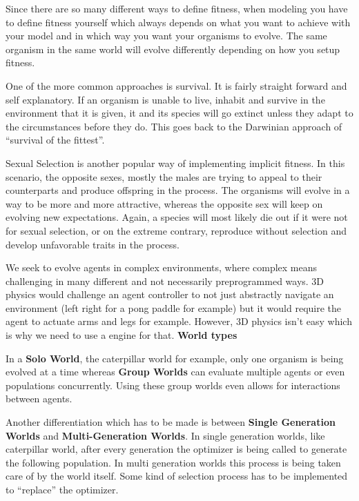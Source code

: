 \documentclass[12pt,oneside,listof=totoc,paper=a4,headings=small]{scrbook}
\begin{document}
Since there are so many different ways to define fitness, when modeling you have to define fitness yourself which always depends on what you want to achieve with your model and in which way you want your organisms to evolve. The same organism in the same world will evolve differently depending on how you setup fitness.

One of the more common approaches is survival. It is fairly straight forward and self explanatory. If an organism is unable to live, inhabit and survive in the environment that it is given, it and its species will go extinct unless they adapt to the circumstances before they do. This goes back to the Darwinian approach of ``survival of the fittest''.

Sexual Selection is another popular way of implementing implicit fitness. In this scenario, the opposite sexes, mostly the males are trying to appeal to their counterparts and produce offspring in the process. The organisms will evolve in a way to be more and more attractive, whereas the opposite sex will keep on evolving new expectations. Again, a species will most likely die out if it were not for sexual selection, or on the extreme contrary, reproduce without selection and develop unfavorable traits in the process.

We seek to evolve agents in complex environments, where complex means challenging in many different and not necessarily preprogrammed ways. 3D physics would challenge an agent controller to not just abstractly navigate an environment (left right for a pong paddle for example) but it would require the agent to actuate arms and legs for example. However, 3D physics isn't easy which is why we need to use a engine for that.
\textbf{World types}

In a \textbf{Solo World}, the caterpillar world for example, only one organism is being evolved at a time whereas \textbf{Group Worlds} can evaluate multiple agents or even populations concurrently. Using these group worlds even allows for interactions between agents.

Another differentiation which has to be made is between \textbf{Single Generation Worlds} and \textbf{Multi-Generation Worlds}. In single generation worlds, like caterpillar world, after every generation the optimizer is being called to generate the following population. In multi generation worlds this process is being taken care of by the world itself. Some kind of selection process has to be implemented to ``replace'' the optimizer.

\newpage
\end{document}
